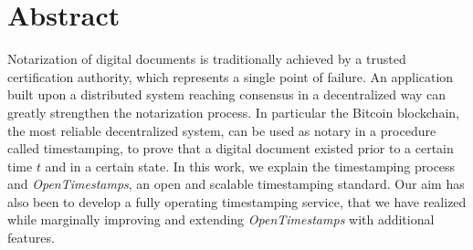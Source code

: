 \chapter{Abstract}
Notarization of digital documents is traditionally achieved by a trusted certification authority, which represents a single point of failure. An application built upon a distributed system reaching consensus in a decentralized way can greatly strengthen the notarization process. In particular the Bitcoin blockchain, the most reliable decentralized system, can be used as notary in a procedure called timestamping, to prove that a digital document existed prior to a certain time $t$ and in a certain state. In this work, we explain the timestamping process and \textit{OpenTimestamps}, an open and scalable timestamping standard. Our aim has also been to develop a fully operating timestamping service, that we have realized while marginally improving and extending \textit{OpenTimestamps} with additional features.